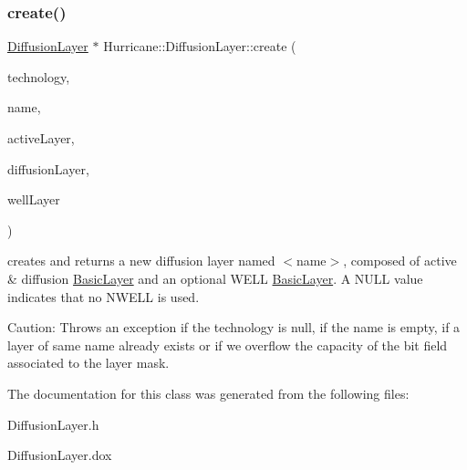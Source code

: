 \subsubsection{\texorpdfstring{create()}{create()}}
{\footnotesize\ttfamily \mbox{\hyperlink{classHurricane_1_1DiffusionLayer}{Diffusion\+Layer}} $\ast$ Hurricane\+::\+Diffusion\+Layer\+::create (\begin{DoxyParamCaption}\item[{\mbox{\hyperlink{classHurricane_1_1Technology}{Technology}} $\ast$}]{technology,  }\item[{const \mbox{\hyperlink{classHurricane_1_1Name}{Name}} \&}]{name,  }\item[{\mbox{\hyperlink{classHurricane_1_1BasicLayer}{Basic\+Layer}} $\ast$}]{active\+Layer,  }\item[{\mbox{\hyperlink{classHurricane_1_1BasicLayer}{Basic\+Layer}} $\ast$}]{diffusion\+Layer,  }\item[{\mbox{\hyperlink{classHurricane_1_1BasicLayer}{Basic\+Layer}} $\ast$}]{well\+Layer }\end{DoxyParamCaption})\hspace{0.3cm}{\ttfamily [static]}}

creates and returns a new diffusion layer named {\ttfamily $<$name$>$}, composed of active \& diffusion \mbox{\hyperlink{classHurricane_1_1BasicLayer}{Basic\+Layer}} and an optional W\+E\+LL \mbox{\hyperlink{classHurricane_1_1BasicLayer}{Basic\+Layer}}. A N\+U\+LL value indicates that no N\+W\+E\+LL is used.

\begin{DoxyParagraph}{Caution\+: Throws an exception if the technology is null, if the name is }
empty, if a layer of same name already exists or if we overflow the capacity of the bit field associated to the layer mask. 
\end{DoxyParagraph}


The documentation for this class was generated from the following files\+:\begin{DoxyCompactItemize}
\item 
Diffusion\+Layer.\+h\item 
Diffusion\+Layer.\+dox\end{DoxyCompactItemize}
